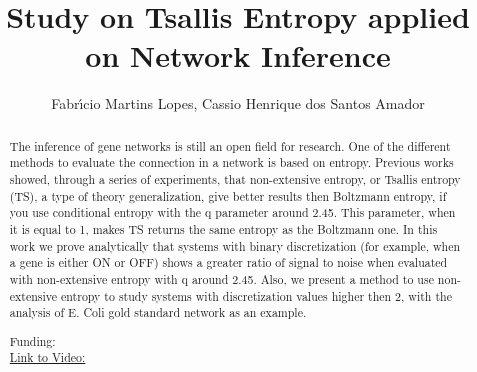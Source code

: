 \documentclass[twoside]{article}
\title{\vspace{-15mm}\fontsize{24pt}{10pt}\selectfont\textbf{ Study on Tsallis Entropy applied on Network Inference }} %
\author{ Fabr\'{\i}cio Martins Lopes,  Cassio Henrique dos Santos Amador }
\affil{ UNIVERSIDADE TECNOL\'OGICA FEDERAL DO PARAN\'A,  Universidade Tecnol\'ogica Federal do Paran\'a (UTFPR) }
\date{}
\begin{document}
  
  
  \maketitle %
  
  
  \thispagestyle{fancy} %
  
  
  \begin{abstract}
  The inference of gene networks is still an open field for research. One of the different methods to evaluate the connection in a network is based on entropy. Previous works showed,  through a series of experiments,  that non-extensive entropy,  or Tsallis entropy (TS),  a type of theory generalization,  give better results then Boltzmann entropy,  if you use conditional entropy with the q parameter around 2.45. This parameter,  when it is equal to 1,  makes TS returns the same entropy as the Boltzmann one. In this work we prove analytically that systems with binary discretization (for example,  when a gene is either ON or OFF) shows a greater ratio of signal to noise when evaluated with non-extensive entropy with q around 2.45. Also,  we present a method to use non-extensive entropy to study systems with discretization values higher then 2,  with the analysis of E. Coli gold standard network as an example.
  
  Funding:   \\
  \href{http://ab3c.org.br/xpress_pres2020/xmxp2020-300303.html}{Link to Video:}

  \end{abstract}
   
  
\end{document}
